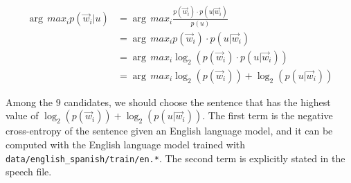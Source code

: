 \documentclass{article}
\begin{document}
\begin{align*}
	\arg\,max_{i} p(\vec{w}_i | u) &= \arg\,max_{i} \frac{p(\vec{w}_i) \cdot p(u | \vec{w}_i)}{p(u)} \\
	&= \arg\,max_{i} p(\vec{w}_i) \cdot p(u | \vec{w}_i) \\
	&= \arg\,max_{i} \log_2 \left( p(\vec{w}_i) \cdot p(u | \vec{w}_i) \right) \\
	&= \arg\,max_{i} \log_2 \left( p(\vec{w}_i) \right) +  \log_2 \left( p(u | \vec{w}_i) \right)
\end{align*}

Among the $9$ candidates, we should choose the sentence that has the highest value of $\log_2 \left( p(\vec{w}_i) \right) +  \log_2 \left( p(u | \vec{w}_i) \right)$. The first term is the negative cross-entropy of the sentence given an English language model, and it can be computed with the English language model trained with \texttt{data/english\_spanish/train/en.*}. The second term is explicitly stated in the speech file.
\end{document}
